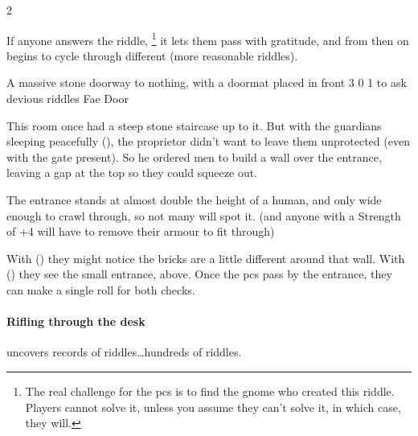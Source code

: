 \begin{multicols}{2}

If anyone answers the riddle,%
\footnote{The real challenge for the \glspl{pc} is to find the gnome who created this riddle. Players cannot solve it, unless you assume they can't solve it, in which case, they will.}
it lets them pass with gratitude, and from then on begins to cycle through different (more reasonable riddles).


  {A massive stone doorway to nothing, with a doormat placed in front}%
  {3}%
  {0}%
  {1}%
  {to ask devious riddles}%
  {Fae Door}%
  {
    \setcounter{Fire}{2}
    \setcounter{Earth}{3}
    \setcounter{Water}{1}
    \setcounter{Academics}{2}
    \setcounter{Caving}{1}
    \setcounter{Xenology}{1}
  }%

\showStdSpells[
  \setcounter{diceNo}{0}
]

\hardestRiddleEver


\begin{exampletext}
  This room once had a steep stone staircase up to it.
  But with the guardians sleeping peacefully (), the proprietor didn't want to leave them unprotected (even with the gate present).
  So he ordered men to build a wall over the entrance, leaving a gap at the top so they could squeeze out.
\end{exampletext}

The entrance stands at almost double the height of a human, and only wide enough to crawl through, so not many will spot it.
(and anyone with a Strength of +4 will have to remove their armour to fit through)

With  (\tn[14]) they might notice the bricks are a little different around that wall.
With  (\tn[12]) they see the small entrance, above.
Once the \glspl{pc} pass by the entrance, they can make a single roll for both checks.

\paragraph{Rifling through the desk}
uncovers records of riddles\ldots hundreds of riddles.


\end{multicols}
